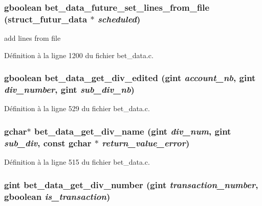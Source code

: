 \subsubsection[{bet\_\-data\_\-future\_\-set\_\-lines\_\-from\_\-file}]{\setlength{\rightskip}{0pt plus 5cm}gboolean bet\_\-data\_\-future\_\-set\_\-lines\_\-from\_\-file ({\bf struct\_\-futur\_\-data} $\ast$ {\em scheduled})}\label{bet__data_8c_af0aa62f96e076cc583fa339a7a2ecc48}
add lines from file 

Définition à la ligne 1200 du fichier bet\_\-data.c.

\subsubsection[{bet\_\-data\_\-get\_\-div\_\-edited}]{\setlength{\rightskip}{0pt plus 5cm}gboolean bet\_\-data\_\-get\_\-div\_\-edited (gint {\em account\_\-nb}, \/  gint {\em div\_\-number}, \/  gint {\em sub\_\-div\_\-nb})}\label{bet__data_8c_a404cd035dc7d1d50729066aa299fe43b}


Définition à la ligne 529 du fichier bet\_\-data.c.

\subsubsection[{bet\_\-data\_\-get\_\-div\_\-name}]{\setlength{\rightskip}{0pt plus 5cm}gchar$\ast$ bet\_\-data\_\-get\_\-div\_\-name (gint {\em div\_\-num}, \/  gint {\em sub\_\-div}, \/  const gchar $\ast$ {\em return\_\-value\_\-error})}\label{bet__data_8c_aea9c573187265658d763308e06b90b05}


Définition à la ligne 515 du fichier bet\_\-data.c.

\subsubsection[{bet\_\-data\_\-get\_\-div\_\-number}]{\setlength{\rightskip}{0pt plus 5cm}gint bet\_\-data\_\-get\_\-div\_\-number (gint {\em transaction\_\-number}, \/  gboolean {\em is\_\-transaction})}\label{bet__data_8c_ab4bf76da9537ef326910893cb8efca75}


